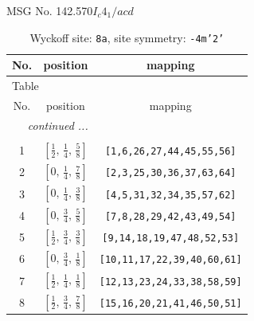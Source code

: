 \documentclass[fleqn,8pt]{jsarticle}
\begin{document}
\setcounter{MaxMatrixCols}{32}

\renewcommand{\tablename}{Table~}
\renewcommand{\figurename}{Figure~}
\begin{center}
\LARGE
MSG No. 142.570\quad$I_{c}4_{1}/acd$
\end{center}
\renewcommand{\arraystretch}{1.2}
\begin{longtable}{ccc}
\caption{Wyckoff site: {\tt 8a}, site symmetry: {\tt -4m'2'}}
 \\
 \hline \hline
No. & position & mapping \\ \hline \endfirsthead

\multicolumn{2}{l}{\tablename\ \thetable{}} \\
 \hline \hline
No. & position & mapping \\ \hline \endhead

 \hline \hline
\multicolumn{2}{r}{\footnotesize\it continued ...} \\ \endfoot

 \hline \hline
\multicolumn{2}{r}{} \\ \endlastfoot

1 & $\left[ \frac{1}{2},\, \frac{1}{4},\, \frac{5}{8} \right]$ & {\tt [1,6,26,27,44,45,55,56]} \\ \hline
2 & $\left[ 0,\, \frac{1}{4},\, \frac{7}{8} \right]$ & {\tt [2,3,25,30,36,37,63,64]} \\ \hline
3 & $\left[ 0,\, \frac{1}{4},\, \frac{3}{8} \right]$ & {\tt [4,5,31,32,34,35,57,62]} \\ \hline
4 & $\left[ 0,\, \frac{3}{4},\, \frac{5}{8} \right]$ & {\tt [7,8,28,29,42,43,49,54]} \\ \hline
5 & $\left[ \frac{1}{2},\, \frac{3}{4},\, \frac{3}{8} \right]$ & {\tt [9,14,18,19,47,48,52,53]} \\ \hline
6 & $\left[ 0,\, \frac{3}{4},\, \frac{1}{8} \right]$ & {\tt [10,11,17,22,39,40,60,61]} \\ \hline
7 & $\left[ \frac{1}{2},\, \frac{1}{4},\, \frac{1}{8} \right]$ & {\tt [12,13,23,24,33,38,58,59]} \\ \hline
8 & $\left[ \frac{1}{2},\, \frac{3}{4},\, \frac{7}{8} \right]$ & {\tt [15,16,20,21,41,46,50,51]} \\
\end{longtable}
\renewcommand{\arraystretch}{1.2}
\end{document}
